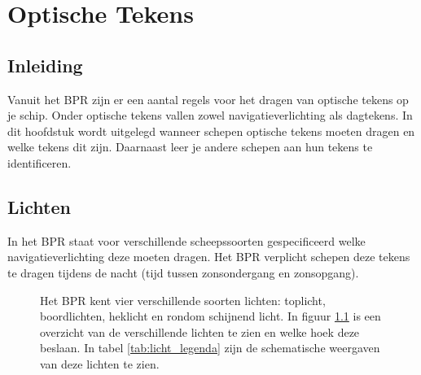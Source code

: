 \chapter{Optische Tekens}
\section{Inleiding}
Vanuit het BPR zijn er een aantal regels voor het dragen van optische tekens op je schip. Onder optische tekens vallen zowel navigatieverlichting als dagtekens. In dit hoofdstuk wordt uitgelegd wanneer schepen optische tekens moeten dragen en welke tekens dit zijn. Daarnaast leer je andere schepen aan hun tekens te identificeren.
\newcommand{\RemoveLine}{\vspace*{-2mm}}

\section{Lichten}
In het BPR staat voor verschillende scheepssoorten gespecificeerd welke navigatieverlichting deze moeten dragen. Het BPR verplicht schepen deze tekens te dragen tijdens de nacht (tijd tussen zonsondergang en zonsopgang).

\vspace*{-0.5cm}
\begin{figure}[H]
	\centering
	\begin{minipage}[t]{0.43\textwidth}
		Het BPR kent vier verschillende soorten lichten: toplicht, boordlichten, heklicht en rondom schijnend licht. In figuur \ref{pic:optische_tekens} is een overzicht van de verschillende lichten te zien en welke hoek deze beslaan. In tabel \ref{tab:licht_legenda} zijn de schematische weergaven van deze lichten te zien.
	\end{minipage}
	\hfill
	\begin{minipage}[t]{0.55\textwidth}
		\RemoveLine
		\caption{}
		\label{pic:optische_tekens}
	\end{minipage}
\end{figure}

